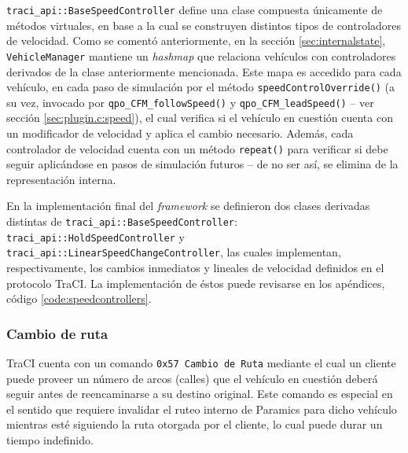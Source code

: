 \texttt{traci\_api::BaseSpeedController} define una clase compuesta únicamente de métodos virtuales, en base a la cual se construyen distintos tipos de controladores de velocidad. Como se comentó anteriormente, en la sección \ref{sec:internalstate}, \texttt{VehicleManager} mantiene un \emph{hashmap} que relaciona vehículos con controladores derivados de la clase anteriormente mencionada. Este mapa es accedido para cada vehículo, en cada paso de simulación por el método \texttt{speedControlOverride()} (a su vez, invocado por \texttt{qpo\_CFM\_followSpeed()} y \texttt{qpo\_CFM\_leadSpeed()} -- ver sección \ref{sec:plugin.c:speed}), el cual verifica si el vehículo en cuestión cuenta con un modificador de velocidad y aplica el cambio necesario. Además, cada controlador de velocidad cuenta con un método \texttt{repeat()} para verificar si debe seguir aplicándose en pasos de simulación futuros -- de no ser así, se elimina de la representación interna.



En la implementación final del \emph{framework} se definieron dos clases derivadas distintas de \texttt{traci\_api::BaseSpeedController}: \texttt{traci\_api::HoldSpeedController} y \texttt{traci\_api::LinearSpeedChangeController}, las cuales implementan, respectivamente, los cambios inmediatos y lineales de velocidad definidos en el protocolo TraCI. La implementación de éstos puede revisarse en los apéndices, código \ref{code:speedcontrollers}.

\subsubsection{Cambio de ruta}\label{sec:routeoverride}

TraCI cuenta con un comando \texttt{0x57 Cambio de Ruta} mediante el cual un cliente puede proveer un número de arcos (calles) que el vehículo en cuestión deberá seguir antes de reencaminarse a su destino original. Este comando es especial en el sentido que requiere invalidar el ruteo interno de Paramics para dicho vehículo mientras esté siguiendo la ruta otorgada por el cliente, lo cual puede durar un tiempo indefinido.


